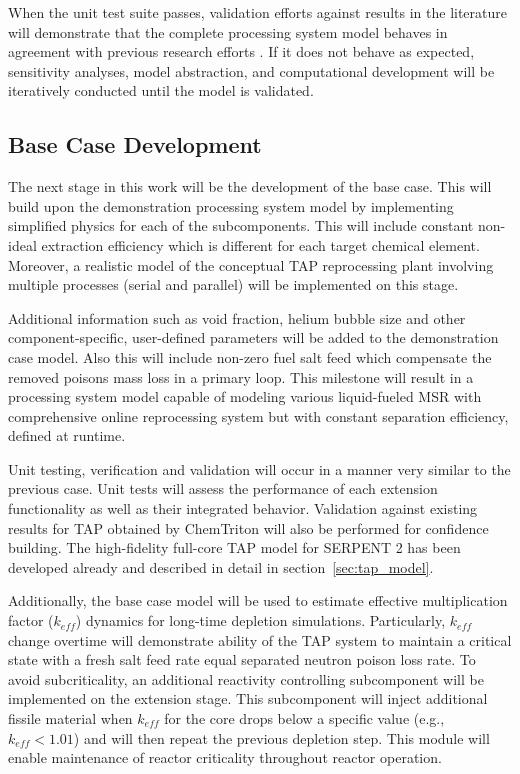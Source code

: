 When the unit test suite passes, validation efforts against results 
in the literature will demonstrate that the complete 
processing system model behaves in agreement with previous research 
efforts \cite{rykhlevskii_advanced_2018, rykhlevskii_modeling_2019}. 
If it does not behave as expected, sensitivity analyses, 
model abstraction, and computational development will be iteratively 
conducted until the model is validated.

\subsection{Base Case Development}
The next stage in this work will be the development of the base case. 
This will build upon the demonstration processing system model by 
implementing simplified physics for each of the subcomponents. This 
will include constant non-ideal extraction efficiency which is 
different for each target chemical element. Moreover, a realistic 
model of the conceptual \gls{TAP} reprocessing plant involving 
multiple processes (serial and parallel) will be implemented on this 
stage. 

Additional information such as void fraction, helium 
bubble size and other component-specific, user-defined 
parameters will be added to the demonstration case model.
Also this will include non-zero fuel salt feed which 
compensate the removed poisons mass loss in a primary loop.
This milestone will result in a processing system model capable of 
modeling various liquid-fueled \gls{MSR} with comprehensive 
online reprocessing system but with constant separation efficiency, 
defined at runtime.

Unit testing, verification and validation will occur in a manner 
very similar to the previous case. Unit tests will assess the 
performance of each extension functionality as well as their 
integrated behavior. Validation against existing results for 
\gls{TAP} obtained by ChemTriton \cite{betzler_two-dimensional_2016, 
betzler_molten_2017} will also be performed for confidence 
building. The high-fidelity full-core \gls{TAP} model for 
SERPENT 2 has been developed already and described in detail 
in section~\ref{sec:tap_model}.

Additionally, the base case model will be used to estimate effective 
multiplication factor ($k_{eff}$) dynamics for long-time 
depletion simulations. Particularly, $k_{eff}$ change overtime 
will demonstrate 
ability of the \gls{TAP} system to maintain a critical state with a
fresh salt feed rate equal separated neutron poison loss rate. 
To avoid subcriticality, an additional reactivity 
controlling subcomponent will be implemented on the extension stage. 
This subcomponent 
will inject additional fissile material 
when $k_{eff}$ for the core drops below a specific value (e.g., 
$k_{eff}<1.01$) and will then repeat the previous depletion step. 
This module will enable maintenance of reactor criticality 
throughout reactor operation.
 
